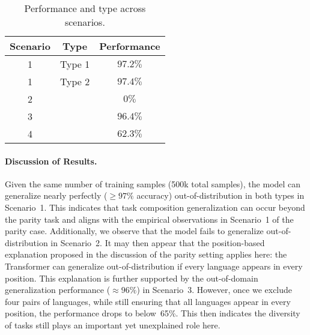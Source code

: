 \begin{table}[h!]
    \centering
    \begin{tabular}{|c|c|c|}
        \hline
        \textbf{Scenario} & \textbf{Type} & \textbf{Performance} \\ \hline
        1 & Type 1 & $97.2\%$ \\ \hline
        1 & Type 2 & $97.4\%$ \\ \hline
        2 &  & $0\%$\\ \hline
        3 &  & $96.4\%$ \\ \hline
        4 &  & $62.3\%$\\ \hline
    \end{tabular}
    \caption{Performance and type across scenarios.}
    \label{tab:scenario_performance_type}
\end{table}




\paragraph{Discussion of Results.} Given the same number of training samples (500k total samples), the model can generalize nearly perfectly ($\geq 97\%$ accuracy) out-of-distribution in both types in Scenario~1. This indicates that task composition generalization can occur beyond the parity task and aligns with the empirical observations in Scenario~1 of the parity case. Additionally, we observe that the model fails to generalize out-of-distribution in Scenario~2. It may then appear that the position-based explanation proposed in the discussion of the parity setting applies here: the Transformer can generalize out-of-distribution if every language appears in every position. This explanation is further supported by the out-of-domain generalization performance ($\approx 96\%$) in Scenario~3. However, once we exclude four pairs of languages, while still ensuring that all languages appear in every position, the performance drops to below~65\%. This then indicates the diversity of tasks still plays an important yet unexplained role here. 